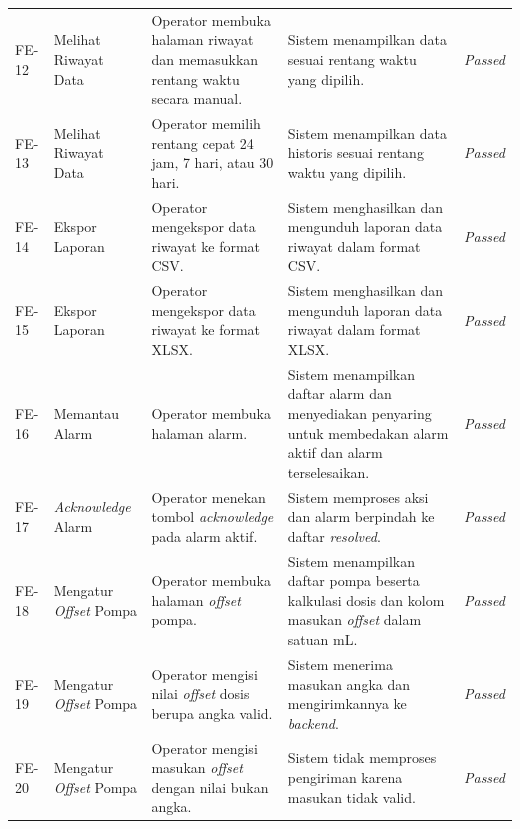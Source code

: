 \begin{longtable}{p{1.2cm}p{2.6cm}p{4.2cm}p{4.2cm}p{1.4cm}}
FE-12 & Melihat Riwayat Data & Operator membuka halaman riwayat dan memasukkan rentang waktu secara manual. & Sistem menampilkan data sesuai rentang waktu yang dipilih. & \textit{Passed} \\
FE-13 & Melihat Riwayat Data & Operator memilih rentang cepat 24 jam, 7 hari, atau 30 hari. & Sistem menampilkan data historis sesuai rentang waktu yang dipilih. & \textit{Passed} \\
FE-14 & Ekspor Laporan & Operator mengekspor data riwayat ke format CSV. & Sistem menghasilkan dan mengunduh laporan data riwayat dalam format CSV. & \textit{Passed} \\
FE-15 & Ekspor Laporan & Operator mengekspor data riwayat ke format XLSX. & Sistem menghasilkan dan mengunduh laporan data riwayat dalam format XLSX. & \textit{Passed} \\
FE-16 & Memantau Alarm & Operator membuka halaman alarm. & Sistem menampilkan daftar alarm dan menyediakan penyaring untuk membedakan alarm aktif dan alarm terselesaikan. & \textit{Passed} \\
FE-17 & \textit{Acknowledge} Alarm & Operator menekan tombol \textit{acknowledge} pada alarm aktif. & Sistem memproses aksi dan alarm berpindah ke daftar \textit{resolved}. & \textit{Passed} \\
FE-18 & Mengatur \textit{Offset} Pompa & Operator membuka halaman \textit{offset} pompa. & Sistem menampilkan daftar pompa beserta kalkulasi dosis dan kolom masukan \textit{offset} dalam satuan mL. & \textit{Passed} \\
FE-19 & Mengatur \textit{Offset} Pompa & Operator mengisi nilai \textit{offset} dosis berupa angka valid. & Sistem menerima masukan angka dan mengirimkannya ke \textit{backend}. & \textit{Passed} \\
FE-20 & Mengatur \textit{Offset} Pompa & Operator mengisi masukan \textit{offset} dengan nilai bukan angka. & Sistem tidak memproses pengiriman karena masukan tidak valid. & \textit{Passed} \\
\end{longtable}

